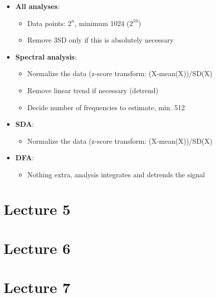 \documentclass[]{book}
\providecommand{\tightlist}{%
  \setlength{\itemsep}{0pt}\setlength{\parskip}{0pt}}
\begin{document}
\begin{itemize}
\tightlist
\item
  \textbf{All analyses}:

  \begin{itemize}
  \tightlist
  \item
    Data points: \(2^n\), minimum 1024 (\(2^{10}\))
  \item
    Remove 3SD only if this is absolutely necessary
  \end{itemize}
\item
  \textbf{Spectral analysis}:

  \begin{itemize}
  \tightlist
  \item
    Normalize the data (z-score transform: (X-mean(X))/SD(X)
  \item
    Remove linear trend if necessary (detrend)
  \item
    Decide number of frequencies to estimate, min. 512
  \end{itemize}
\item
  \textbf{SDA}:

  \begin{itemize}
  \tightlist
  \item
    Normalize the data (z-score transform: (X-mean(X))/SD(X)
  \end{itemize}
\item
  \textbf{DFA}:

  \begin{itemize}
  \tightlist
  \item
    Nothing extra, analysis integrates and detrends the signal
  \end{itemize}
\end{itemize}

\chapter*{Lecture 5}\label{lecture-5}

\chapter*{Lecture 6}\label{lecture-6}

\chapter*{Lecture 7}\label{lecture-7}
\end{document}
